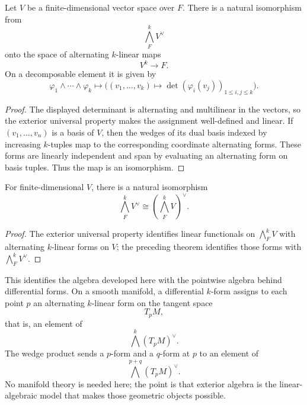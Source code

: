\begin{theorem}
Let \(V\) be a finite-dimensional vector space over \(F\).  There is a
natural isomorphism from
\[
\bigwedge_F^kV^\vee
\]
onto the space of alternating \(k\)-linear maps
\[
V^k\longrightarrow F.
\]
On a decomposable element it is given by
\[
\varphi_1\wedge\cdots\wedge\varphi_k
\longmapsto
\bigl((v_1,\ldots,v_k)\mapsto
\det(\varphi_i(v_j))_{1\leq i,j\leq k}\bigr).
\]
\end{theorem}
\begin{proof}
The displayed determinant is alternating and multilinear in the vectors, so
the exterior universal property makes the assignment well-defined and
linear.  If \((v_1,\ldots,v_n)\) is a basis of \(V\), then the wedges of its
dual basis indexed by increasing \(k\)-tuples map to the corresponding
coordinate alternating forms.  These forms are linearly independent and
span by evaluating an alternating form on basis tuples.  Thus the map is an
isomorphism.
\end{proof}

\begin{corollary}
For finite-dimensional \(V\), there is a natural isomorphism
\[
\bigwedge_F^kV^\vee\cong(\bigwedge_F^kV)^\vee.
\]
\end{corollary}
\begin{proof}
The exterior universal property identifies linear functionals on
\(\bigwedge_F^kV\) with alternating \(k\)-linear forms on \(V\); the
preceding theorem identifies those forms with \(\bigwedge_F^kV^\vee\).
\end{proof}

This identifies the algebra developed here with the pointwise algebra behind
differential forms.  On a smooth manifold, a differential \(k\)-form assigns
to each point \(p\) an alternating \(k\)-linear form on the tangent space
\[
T_pM,
\]
that is, an element of
\[
\bigwedge^k(T_pM)^\vee.
\]
The wedge product sends a \(p\)-form and a \(q\)-form at \(p\) to an element
of
\[
\bigwedge^{p+q}(T_pM)^\vee.
\]
No manifold theory is needed here; the point is that exterior algebra is the
linear-algebraic model that makes those geometric objects possible.
